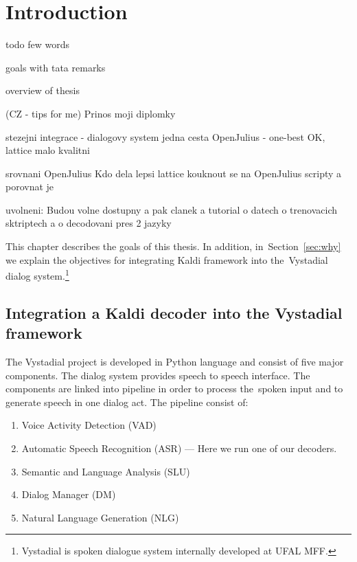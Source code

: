 \chapter{Introduction}
\label{chap:intro}

todo few words

goals with tata remarks


overview of thesis


(CZ - tips for me)
Prinos moji diplomky
  
stezejni integrace - dialogovy system
    jedna cesta OpenJulius - one-best OK, lattice malo kvalitni

srovnani OpenJulius
    Kdo dela lepsi lattice
    kouknout se na OpenJulius scripty
    a porovnat je

uvolneni: Budou volne dostupny a pak clanek a tutorial
o datech o trenovacich sktriptech a o decodovani pres 2 jazyky



  
This chapter describes the goals of this thesis. 
In addition, in~Section~\ref{sec:why} we explain the objectives for integrating Kaldi framework into the~Vystadial dialog system.\footnote{Vystadial is spoken dialogue system internally developed at UFAL MFF.} 


\section{Integration a Kaldi decoder into the Vystadial framework} 
\label{sec:integrate_kaldi_decoder_into_vystadial_framework}
The Vystadial project is developed in Python language and consist of five major components. 
The dialog system provides speech to speech interface. The components are linked into pipeline in order to process the~spoken input and to generate speech in one dialog act.
The pipeline consist of:
\begin{enumerate}
    \item Voice Activity Detection (VAD)
    \item Automatic Speech Recognition (ASR) --- Here we run one of our decoders.
    \item Semantic and Language Analysis (SLU)
    \item Dialog Manager (DM)
    \item Natural Language Generation (NLG)
\end{enumerate}

